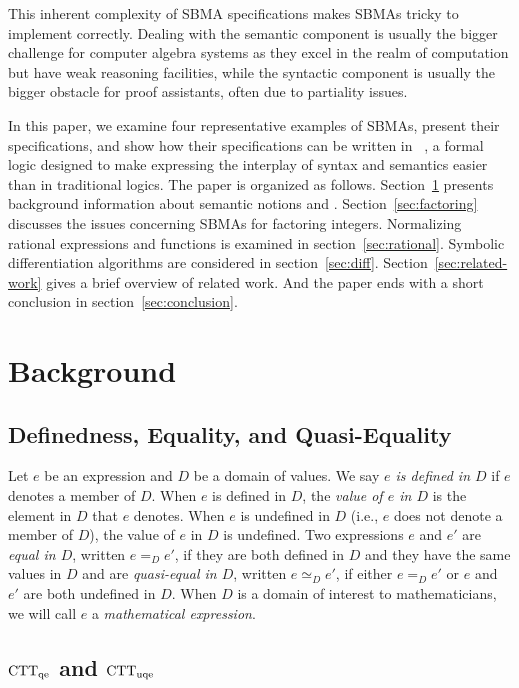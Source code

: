 \documentclass[fleqn]{llncs}
\begin{document}
This inherent complexity of SBMA specifications makes SBMAs
tricky to implement correctly.  Dealing with the semantic component is usually
the bigger challenge for computer algebra systems as they excel in the
realm of computation but have weak reasoning facilities, while the syntactic
component is usually the bigger obstacle for proof assistants, often due
to partiality issues.

\bsp In this paper, we examine four representative examples of SBMAs,
present their specifications, and show how their specifications can be
written in {\churchuqe}~\cite{Farmer17}, a formal logic designed to
make expressing the interplay of syntax and semantics easier than in
traditional logics.  The paper is organized as follows.
Section~\ref{sec:background} presents background information about
semantic notions and {\churchuqe}.  Section~\ref{sec:factoring}
discusses the issues concerning SBMAs for factoring
integers. Normalizing rational expressions and functions is examined
in section~\ref{sec:rational}.  Symbolic differentiation algorithms
are considered in section~\ref{sec:diff}.
Section~\ref{sec:related-work} gives a brief overview of related work.
And the paper ends with a short conclusion in
section~\ref{sec:conclusion}.  \esp

\section{Background}\label{sec:background}

\subsection{Definedness, Equality, and Quasi-Equality}

Let $e$ be an expression and $D$ be a domain of values.  We say
\emph{$e$ is defined in $D$} if $e$ denotes a member of $D$.  When $e$
is defined in $D$, the \emph{value of $e$ in $D$} is the element in
$D$ that $e$ denotes.  When $e$ is undefined in $D$ (i.e., $e$ does
not denote a member of $D$), the value of $e$ in $D$ is undefined.
Two expressions $e$ and $e'$ are \emph{equal in $D$}, written $e =_D
e'$, if they are both defined in $D$ and they have the same values in
$D$ and are \emph{quasi-equal in $D$}, written $e \simeq_D e'$, if
either $e =_D e'$ or $e$ and $e'$ are both undefined in $D$. When $D$
is a domain of interest to mathematicians, we will call $e$ a
\emph{mathematical expression}.

\subsection{${\rm CTT}_{\rm qe}$ and ${\rm CTT}_{\rm uqe}$}
\end{document}

